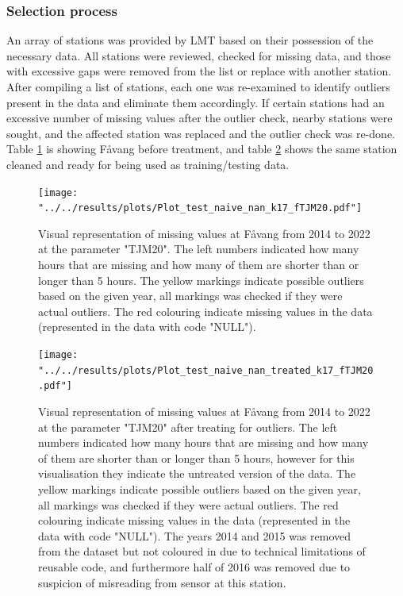 \subsubsection{Selection process}

An array of stations was provided by LMT based on their possession of the necessary data. All stations were reviewed, checked for missing data, and those with excessive gaps were removed from the list or replace with another station. After compiling a list of stations, each one was re-examined to identify outliers present in the data and eliminate them accordingly. If certain stations had an excessive number of missing values after the outlier check, nearby stations were sought, and the affected station was replaced and the outlier check was re-done. Table \ref{fig:plot-17} is showing Fåvang before treatment, and table \ref{fig:plot-17-treated} shows the same station cleaned and ready for being used as training/testing data.

\begin{figure}
		\centering
		\begin{adjustwidth}{-1in}{-1in}
			\texttt{[image: "../../results/plots/Plot\_test\_naive\_nan\_k17\_fTJM20.pdf"]}
		\end{adjustwidth}
		\caption[Visual representation of Fåvang]{Visual representation of missing values at Fåvang from 2014 to 2022 at the parameter "TJM20". The left numbers indicated how many hours that are missing and how many of them are shorter than or longer than 5 hours. The yellow markings indicate possible outliers based on the given year, all markings was checked if they were actual outliers. The red colouring indicate missing values in the data (represented in the data with code "NULL").}
		\label{fig:plot-17}
\end{figure}
\begin{figure}
		\centering
		\begin{adjustwidth}{-1in}{-1in}
			\texttt{[image: "../../results/plots/Plot\_test\_naive\_nan\_treated\_k17\_fTJM20.pdf"]}
		\end{adjustwidth}
		\caption[Visual representation of Fåvang treated]{Visual representation of missing values at Fåvang from 2014 to 2022 at the parameter "TJM20" after treating for outliers. The left numbers indicated how many hours that are missing and how many of them are shorter than or longer than 5 hours, however for this visualisation they indicate the untreated version of the data. The yellow markings indicate possible outliers based on the given year, all markings was checked if they were actual outliers. The red colouring indicate missing values in the data (represented in the data with code "NULL"). The years 2014 and 2015 was removed from the dataset but not coloured in due to technical limitations of reusable code, and furthermore half of 2016 was removed due to suspicion of misreading from sensor at this station.}
		\label{fig:plot-17-treated}
\end{figure}

